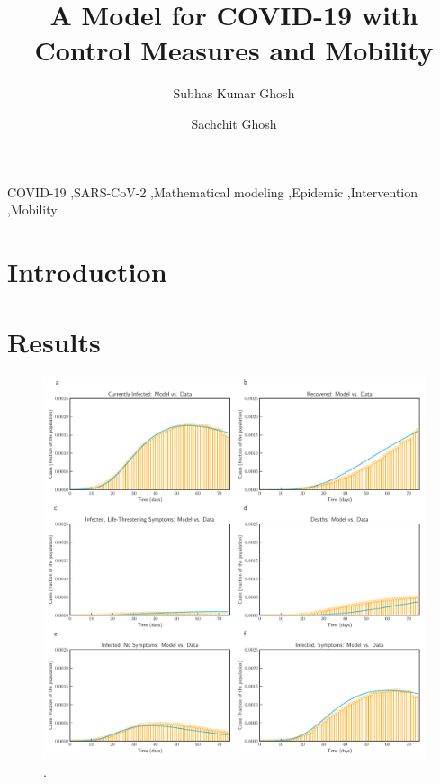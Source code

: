 \documentclass[authoryear,preprint]{elsarticle}
\begin{document}
	
	\begin{frontmatter}		
		\title{A Model for COVID-19 with Control Measures and Mobility}
		
		\author[a1]{Subhas Kumar Ghosh}
		\author[a2]{Sachchit Ghosh}
	
		
		\address[a1]{Commonwealth Bank of Australia, Sydney, New South Wales, 2000, Australia}
		\address[a2]{The University of Sydney, Camperdown, NSW 2006, Australia}
	
		
		\begin{abstract}
		\end{abstract}
		
		\begin{keyword}
			COVID-19 \sep SARS-CoV-2 \sep Mathematical modeling \sep Epidemic \sep Intervention \sep Mobility			
		\end{keyword}
		
	\end{frontmatter}
	
	
\section{Introduction}
\label{SEC1}
	
\section{Results}
\label{SEC2}
\begin{figure}
	\centering
	\includegraphics[width=\textwidth]{Italy_plot_model_data.pdf}
	\caption{.} 
	\label{fig1} 
\end{figure}
\end{document}
